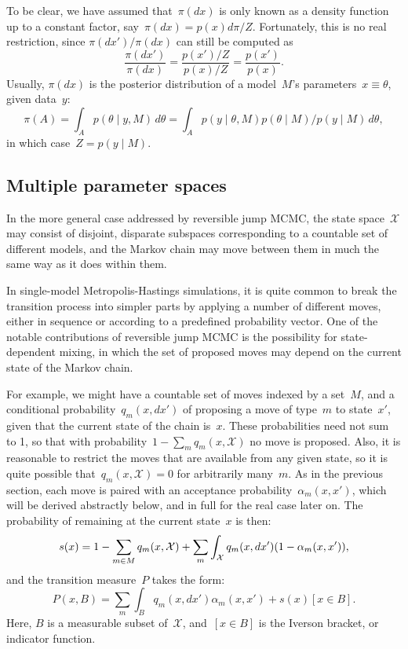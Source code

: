 \documentclass[11pt,a4paper]{article}
\newcommand\mc[1]{\mathcal{#1}}                  %
\DeclarePairedDelimiter\lr{\lparen}{\rparen}     %
\theoremstyle{definition}
\begin{document}
To be clear, we have assumed that~$\pi(dx)$ is only known as a density function
up to a constant factor, say~$\pi(dx) = p(x)d\pi/Z$. Fortunately, this is no
real restriction, since $\pi(dx')/\pi(dx)$ can still be computed as
\[ \frac{\pi(dx')}{\pi(dx)} = \frac{p(x')/Z}{p(x)/Z} = \frac{p(x')}{p(x)}. \]
Usually, $\pi(dx)$ is the posterior distribution of a model~$M$'s parameters~$x
\equiv \theta$, given data~$y$:
\[ \pi(A) = \int_A p(\theta \mid y,M)\,d\theta
  = \int_A p(y \mid \theta,M)p(\theta \mid M)/p(y \mid M)\,d\theta, \]
in which case~$Z = p(y \mid M)$.

\subsection{Multiple parameter spaces} %
\label{sec:multiple}

In the more general case addressed by reversible jump MCMC, the state
space~$\mc{X}$ may consist of disjoint, disparate subspaces corresponding to a
countable set of different models, and the Markov chain may move between them in
much the same way as it does within them.

In single-model Metropolis-Hastings simulations, it is quite common to break the
transition process into simpler parts by applying a number of different moves,
either in sequence or according to a predefined probability vector. One of the
notable contributions of reversible jump MCMC is the possibility for
state-dependent mixing, in which the set of proposed moves may depend on the
current state of the Markov chain.

For example, we might have a countable set of moves indexed by a set~$M$, and a
conditional probability~$q_m(x,dx')$ of proposing a move of type~$m$ to
state~$x'$, given that the current state of the chain is~$x$. These
probabilities need not sum to 1, so that with probability~$1 - \sum_m
q_m(x,\mc{X})$ no move is proposed. Also, it is reasonable to restrict the moves
that are available from any given state, so it is quite possible
that~$q_m(x,\mc{X}) = 0$ for arbitrarily many~$m$. As in the previous section,
each move is paired with an acceptance probability~$\alpha_m(x,x')$, which will
be derived abstractly below, and in full for the real case later on. The
probability of remaining at the current state~$x$ is then:
\[ s(x) = 1 - \sum_{m\in M} q_m(x,\mc{X})
  + \sum_m \int_{\mc{X}} q_m(x,dx')\lr*{1 - \alpha_m(x,x')}, \]
and the transition measure~$P$ takes the form:
\[ P(x,B) = \sum_m \int_B q_m(x,dx')\alpha_m(x,x') + s(x)[x \in B]. \]
Here, $B$ is a measurable subset of~$\mc{X}$, and~$[x \in B]$ is the Iverson
bracket, or indicator function.
\end{document}
